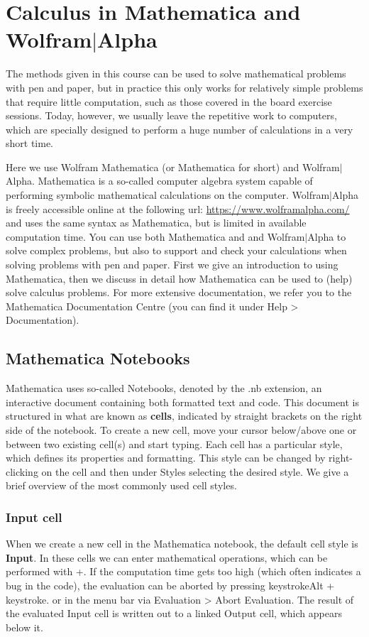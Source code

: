 \chapter{Calculus in Mathematica and Wolfram$\mid$Alpha}
\label{PC-Lab 1}
\graphicspath{{figures/Mathematica/}}
The methods given in this course can be used to solve mathematical problems with pen and paper, but in practice this only works for relatively simple problems that require little computation, such as those covered in the board exercise sessions. Today, however, we usually leave the repetitive work to computers, which are specially designed to perform a huge number of calculations in a very short time.

Here we use Wolfram Mathematica (or Mathematica for short) and Wolfram$\mid$Alpha. Mathematica is a so-called computer algebra system capable of performing symbolic mathematical calculations on the computer. Wolfram$\mid$Alpha is freely accessible online at the following url: \url{https://www.wolframalpha.com/} and uses the same syntax as Mathematica, but is limited in available computation time.  You can use both Mathematica and and Wolfram$\mid$Alpha to solve complex problems, but also to support and check your calculations when solving problems with pen and paper. First we give an introduction to using Mathematica, then we discuss in detail how Mathematica can be used to (help) solve calculus problems. For more extensive documentation, we refer you to the Mathematica Documentation Centre (you can find it under Help > Documentation).

\section{Mathematica Notebooks}
Mathematica uses so-called Notebooks, denoted by the .nb extension, an interactive document containing both formatted text and code. This document is structured in what are known as \textbf{cells}, indicated by straight brackets on the right side of the notebook. To create a new cell, move your cursor below/above one or between two existing cell(s) and start typing.
Each cell has a particular style, which defines its properties and formatting. This style can be changed by right-clicking on the cell and then under Styles selecting the desired style. We give a brief overview of the most commonly used cell styles.

\subsection{Input cell}
When we create a new cell in the Mathematica notebook, the default cell style is \textbf{Input}. In these cells we can enter mathematical operations, which can be performed with +. If the computation time gets too high (which often indicates a bug in the code), the evaluation can be aborted by pressing keystroke{Alt} + keystroke{.} or in the menu bar via Evaluation > Abort Evaluation. The result of the evaluated Input cell is written out to a linked Output cell, which appears below it.

